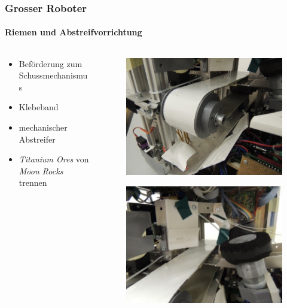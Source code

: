 \begin{frame}
	\frametitle{Grosser Roboter}
	\framesubtitle{Riemen und Abstreifvorrichtung}
	\begin{columns}
	\begin{column}{0.6 \textwidth}
		\begin{itemize}
			\item Beförderung zum Schussmechanismus
			\item Klebeband
			\item mechanischer Abstreifer
			\item \textit{Titanium Ores} von \textit{Moon Rocks} trennen
		\end{itemize}
	\end{column}
	\begin{column}{0.4 \textwidth}
		\vspace{-2.5em}
		\begin{figure}[h]
			\centering
			\includegraphics[width = 0.9 \textwidth]{../images/presentation/riemen.jpg}
		\end{figure}
		\vspace{-2.2em}
		\begin{figure}[h]
			\centering
			\includegraphics[width = 0.9 \textwidth]{../images/presentation/abstreifvorrichtung.jpg}
		\end{figure}
	\end{column}
\end{columns}
\end{frame}

